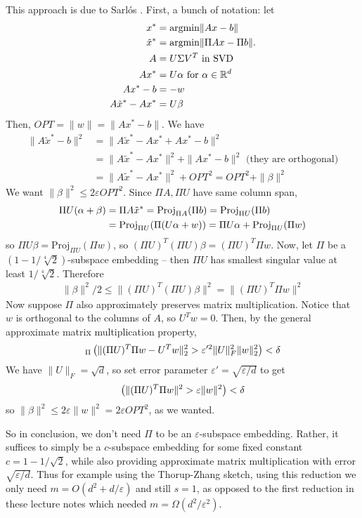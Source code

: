 \documentclass[11pt]{article}
\let\Pr\relax
\DeclareMathOperator*{\Pr}{\mathbb{P}}
\newcommand{\eps}{\varepsilon}
\newcommand{\R}{\mathbb{R}}
\begin{document}
This approach is due to Sarl\'{o}s \cite{sarlos2006improved}. First, a bunch of notation: let 
\begin{align*}
x^*&=\textup{argmin}\|Ax-b\|
\\
\tilde{x}^*&=\textup{argmin}\|\Pi Ax-\Pi b\|. 
\\
A&=U\Sigma V^T\text{ in SVD}
\\
Ax^*&=U\alpha \text{ for }\alpha\in\R^d 
\\
Ax^*-b&=-w
\\
A\tilde{x}^*-Ax^*&=U\beta
\end{align*} 
Then, $OPT = \|w\|=\|Ax^*-b\|$. We have
\begin{align*}
	\|A\tilde{x}^*-b\|^2&=\|A\tilde{x}^*-Ax^*+Ax^*-b\|^2
	\\
	&=\|A\tilde{x}^*-Ax^*\|^2+\|Ax^*-b\|^2\text{ (they are orthogonal)}
	\\
	&=\|A\tilde{x}^*-Ax^*\|^2+OPT^2=OPT^2+\|\beta\|^2
\end{align*}
We want $\|\beta\|^2\leq 2\eps OPT^2$. Since $\Pi A,\Pi U$ have same column span, 
\begin{align*}
	\Pi U(\alpha +\beta)&=\Pi A\tilde{x}^*=\textup{Proj}_{\Pi A}(\Pi b)=\textup{Proj}_{\Pi U}(\Pi b)
	\\
	&=\textup{Proj}_{\Pi U}(\Pi(U\alpha+w))=\Pi U\alpha + \textup{Proj}_{\Pi U}(\Pi w)
\end{align*}
so $\Pi U \beta= \text{Proj}_{\Pi U}(\Pi w)$, so $(\Pi U)^T(\Pi U)\beta = (\Pi U)^T\Pi w$. Now, let $\Pi$ be a $(1 - 1/\sqrt[4]{2})$-subspace embedding -- then $\Pi U$ has smallest singular value at least $1/\sqrt[4]{2}$. Therefore
\begin{align*}
	\|\beta\|^2/2\leq \|(\Pi U)^T(\Pi U)\beta\|^2=\|(\Pi U)^T\Pi w\|^2
\end{align*}
Now suppose $\Pi$ also approximately preserves matrix multiplication. Notice that $w$ is orthogonal to the columns of $A$, so $U^Tw=0$. Then, by the general approximate matrix multiplication property,
\begin{align*}
	\Pr_\Pi\left(\|(\Pi U)^T\Pi w-U^Tw\|_2^2>\eps'^2\|U\|_F^2\|w\|_2^2\right)<\delta
\end{align*}
We have $\|U\|_F = \sqrt{d}$, so set error parameter $\eps'=\sqrt{\eps/d}$ to get
\begin{align*}
	\Pr\left(\|(\Pi U)^T\Pi w\|^2>\eps\|w\|^2\right)<\delta
\end{align*}
so $\|\beta\|^2\leq 2\eps \|w\|^2=2\eps OPT^2$, as we wanted. 

So in conclusion, we don't need $\Pi$ to be an $\eps$-subspace embedding. Rather, it suffices to simply be a $c$-subspace embedding for some fixed constant $c = 1 - 1/\sqrt{2}$, while also providing approximate matrix multiplication with error $\sqrt{\eps/d}$.  Thus for example using the Thorup-Zhang sketch, using this reduction we only need $m=O(d^2+d/\eps)$ and still $s=1$, as opposed to the first reduction in these lecture notes which needed $m = \Omega(d^2/\eps^2)$. 
\end{document}
